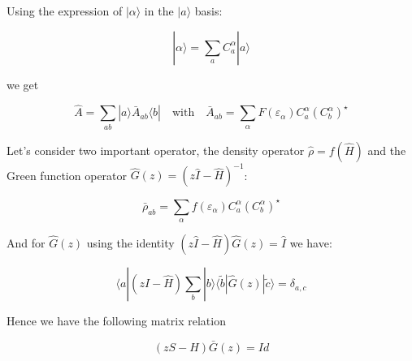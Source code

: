 \documentclass{article}
\newcommand{\bra}[1]{\langle #1|}
\newcommand{\ket}[1]{|#1\rangle}
\newcommand{\op}[1]{\hat{#1}}
\begin{document}
\noindent
Using the expression of $\ket{\alpha}$ in the $\ket{a}$ basis:

\[\ket{\alpha}=\sum_a C_a^{\alpha}\ket{a}  \]
\noindent


\noindent
we get


\[ \op{A}= \sum_{ab} \ket{a}\bar{A}_{ab} \bra{b} \quad \text{with} \quad 
\bar{A}_{ab}=
\sum_{\alpha} F(\varepsilon_{\alpha})C_a^{\alpha}(C_{b}^{\alpha})^{\star} \]

\noindent
Let's consider two important operator, the density operator $\op{\rho}=f(\op{H})$ and the Green function operator $\op{G}(z)=(z\op{I}-\op{H})^{-1}$:

\noindent
\[ \bar{\rho}_{ab}=
\sum_{\alpha} f(\varepsilon_{\alpha})C_a^{\alpha}(C_{b}^{\alpha})^{\star} \]

\noindent
And for $\op{G}(z)$ using the identity $(z\op{I}-\op{H})\op{G}(z)=\op{I}$ we have:

\[ \bra{a}(z\op{I}-\op{H})\sum_b \ket{b}\bra{\tilde{b}}\op{G}(z) \ket{\tilde{c}}=\delta_{a,c}\]

\noindent
Hence we have the following matrix relation

\[(zS-H)\bar{G}(z)=Id\]



\noindent



\smallskip


\noindent



\end{document}

